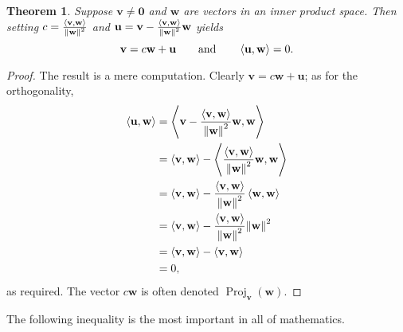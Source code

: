 \documentclass[11pt]{article}
\renewcommand{\vec}[1]{\mathbf{#1}}
\newtheorem{theorem}{Theorem}
\begin{document}
\begin{adjustwidth}{0.5cm}{}
  \begin{theorem}
	  Suppose $\vec{v} \ne \vec{0}$ and $\vec{w}$ are vectors in an inner product space. Then setting $c = \frac{\ev{\vec{v}, \vec{w}}}{\norm{\vec{w}}^{2}}$ and $\vec{u} = \vec{v} - \frac{\ev{\vec{v}, \vec{w}}}{\norm{\vec{w}}^{2}} \vec{w}$ yields
	  \[
		  \vec{v} = c \vec{w} + \vec{u} \qquad \text{and} \qquad \ev{\vec{u}, \vec{w}} = 0.
	  \]
  \end{theorem}
	\begin{proof}
		The result is a mere computation. Clearly $\vec{v} = c \vec{w} + \vec{u}$; as for the orthogonality,
		\begin{align*}
			\ev{\vec{u}, \vec{w}} &= \ev{\vec{v} - \frac{\ev{\vec{v}, \vec{w}}}{\norm{\vec{w}}^{2}} \vec{w}, \vec{w}} \\
			&= \ev{\vec{v}, \vec{w}} - \ev{\frac{\ev{\vec{v}, \vec{w}}}{\norm{\vec{w}}^{2}} \vec{w}, \vec{w}} \\
			&= \ev{\vec{v}, \vec{w}} - \frac{\ev{\vec{v}, \vec{w}}}{\norm{\vec{w}}^{2}} \ev{\vec{w}, \vec{w}}\\ 
			&= \ev{\vec{v}, \vec{w}} - \frac{\ev{\vec{v}, \vec{w}}}{\norm{\vec{w}}^{2}} \norm{\vec{w}}^{2} \\
			&= \ev{\vec{v}, \vec{w}} - \ev{\vec{v}, \vec{w}} \\
			&= 0,
		\end{align*}
		as required. The vector $c \vec{w}$ is often denoted $\operatorname{Proj}_{\vec{v}}(\vec{w})$.
	\end{proof}
\end{adjustwidth}

The following inequality is the most important in all of mathematics.
\end{document}
